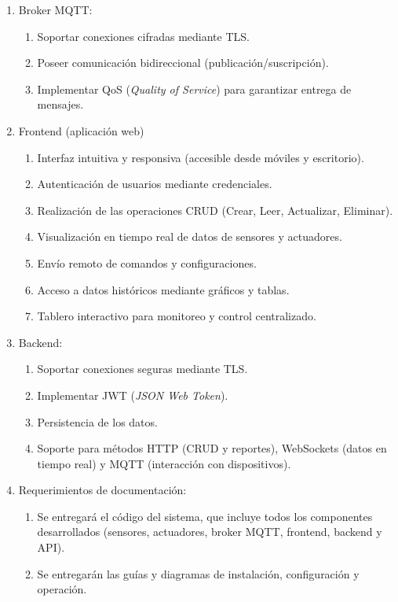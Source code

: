 \begin{enumerate}
      \item Broker MQTT:
            \begin{enumerate}
                  \item Soportar conexiones cifradas mediante TLS.
                  \item Poseer comunicación bidireccional (publicación/suscripción).
                  \item Implementar QoS (\textit{Quality of Service}) para garantizar entrega de
                        mensajes.
            \end{enumerate}

      \item Frontend (aplicación web)
            \begin{enumerate}
                  \item Interfaz intuitiva y responsiva (accesible desde móviles y escritorio).
                  \item Autenticación de usuarios mediante credenciales.
                  \item Realización de las operaciones CRUD (Crear, Leer, Actualizar, Eliminar).
                  \item Visualización en tiempo real de datos de sensores y actuadores.
                  \item Envío remoto de comandos y configuraciones.
                  \item Acceso a datos históricos mediante gráficos y tablas.
                  \item Tablero interactivo para monitoreo y control centralizado.
            \end{enumerate}

      \item Backend:
            \begin{enumerate}
                  \item Soportar conexiones seguras mediante TLS.
                  \item Implementar JWT (\textit{JSON Web Token}).
                  \item Persistencia de los datos.
                  \item Soporte para métodos HTTP (CRUD y reportes), WebSockets (datos en tiempo real)
                        y MQTT (interacción con dispositivos).
            \end{enumerate}

      \item Requerimientos de documentación:
            \begin{enumerate}
                  \item Se entregará el código del sistema, que incluye todos los componentes
                        desarrollados (sensores, actuadores, broker MQTT, frontend, backend y API).
                  \item Se entregarán las guías y diagramas de instalación, configuración y operación.
            \end{enumerate}
\end{enumerate}

